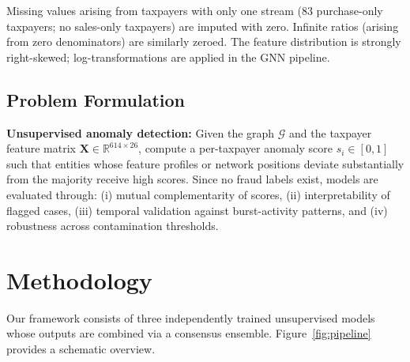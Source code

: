 \documentclass[10pt,twocolumn]{article}
\begin{document}
Missing values arising from taxpayers with only one stream (83 purchase-only
taxpayers; no sales-only taxpayers) are imputed with zero. Infinite ratios
(arising from zero denominators) are similarly zeroed. The feature distribution
is strongly right-skewed; log-transformations are applied in the GNN pipeline.

\subsection{Problem Formulation}

\textbf{Unsupervised anomaly detection:} Given the graph $\mathcal{G}$ and the
taxpayer feature matrix $\mathbf{X} \in \mathbb{R}^{614 \times 26}$, compute a
per-taxpayer anomaly score $s_i \in [0,1]$ such that entities whose feature
profiles or network positions deviate substantially from the majority receive
high scores. Since no fraud labels exist, models are evaluated through:
(i) mutual complementarity of scores, (ii) interpretability of flagged cases,
(iii) temporal validation against burst-activity patterns, and
(iv) robustness across contamination thresholds.

\section{Methodology}
\label{sec:method}

Our framework consists of three independently trained unsupervised models
whose outputs are combined via a consensus ensemble. Figure~\ref{fig:pipeline}
provides a schematic overview.
\end{document}

